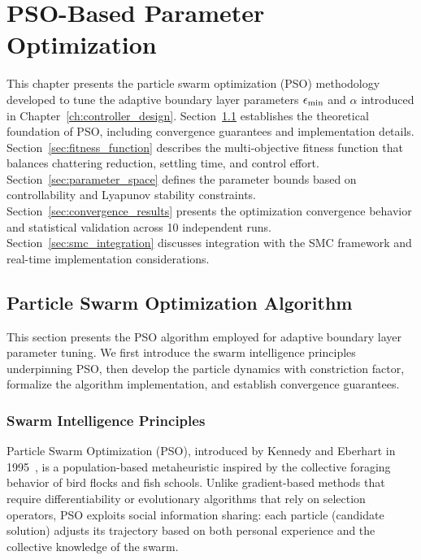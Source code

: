 \chapter{PSO-Based Parameter Optimization}
\label{ch:pso_optimization}

This chapter presents the particle swarm optimization (PSO) methodology developed to tune the adaptive boundary layer parameters $\epsilon_{\min}$ and $\alpha$ introduced in Chapter~\ref{ch:controller_design}. Section~\ref{sec:pso_algorithm} establishes the theoretical foundation of PSO, including convergence guarantees and implementation details. Section~\ref{sec:fitness_function} describes the multi-objective fitness function that balances chattering reduction, settling time, and control effort. Section~\ref{sec:parameter_space} defines the parameter bounds based on controllability and Lyapunov stability constraints. Section~\ref{sec:convergence_results} presents the optimization convergence behavior and statistical validation across 10 independent runs. Section~\ref{sec:smc_integration} discusses integration with the SMC framework and real-time implementation considerations.

\section{Particle Swarm Optimization Algorithm}
\label{sec:pso_algorithm}

This section presents the PSO algorithm employed for adaptive boundary layer parameter tuning. We first introduce the swarm intelligence principles underpinning PSO, then develop the particle dynamics with constriction factor, formalize the algorithm implementation, and establish convergence guarantees.

\subsection{Swarm Intelligence Principles}
\label{subsec:swarm_intelligence}

Particle Swarm Optimization (PSO), introduced by Kennedy and Eberhart in 1995~\cite{kennedy1995particle}, is a population-based metaheuristic inspired by the collective foraging behavior of bird flocks and fish schools. Unlike gradient-based methods that require differentiability or evolutionary algorithms that rely on selection operators, PSO exploits social information sharing: each particle (candidate solution) adjusts its trajectory based on both personal experience and the collective knowledge of the swarm.

